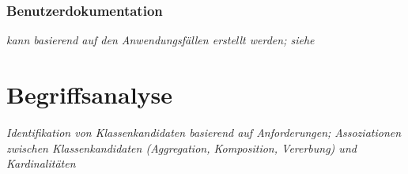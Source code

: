 \subsubsection{Benutzerdokumentation}

{\em kann basierend auf den Anwendungsf\"allen erstellt werden; siehe
}

\section{Begriffsanalyse}

{\em Identifikation von Klassenkandidaten basierend auf Anforderungen;
Assoziationen zwischen Klassenkandidaten (Aggregation, Komposition, Vererbung)
und Kardinalit\"aten}


